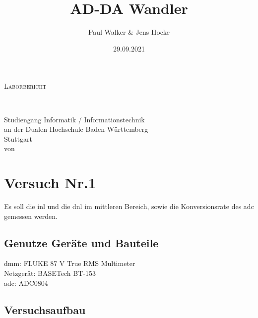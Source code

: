\documentclass[12pt, a4paper, ngerman]{article}
\title{AD-DA Wandler}
\author{Paul Walker \& Jens Hocke}
\date{29.09.2021}
\newcommand{\Was}{Laborbericht}
\newcommand{\Studiengang}{Informatik / Informationstechnik}
\begin{document}
\makeatletter
\begin{titlepage}
  \begin{center}
    \vspace*{1cm}
    {\Huge\scshape \Was}\\[2cm]
    \begin{center}
      \linespread{1}\Huge \@title\\[2cm]
    \end{center}
    {\large Studiengang \Studiengang}\\
    {\large an der Dualen Hochschule Baden-Württemberg\\ Stuttgart}\\[2cm]
    {\large von}\\
    {\large\bfseries \@author}
    \vfill
  \end{center}
\end{titlepage}
\makeatother

\tableofcontents

\newpage
\thispagestyle{simple}
\printacronyms[name=Abkürzungsverzeichnis, heading=section*]
\newpage

\section{Versuch Nr.1}

Es soll die \ac{inl} und die \ac{dnl} im mittleren Bereich,
sowie die Konversionsrate des \ac{adc} gemessen werden.

\subsection{Genutze Geräte und Bauteile}

\ac{dmm}: FLUKE 87 V True RMS Multimeter \\
Netzgerät: BASETech BT-153 \\
\ac{adc}: ADC0804

\subsection{Versuchsaufbau}
\end{document}
